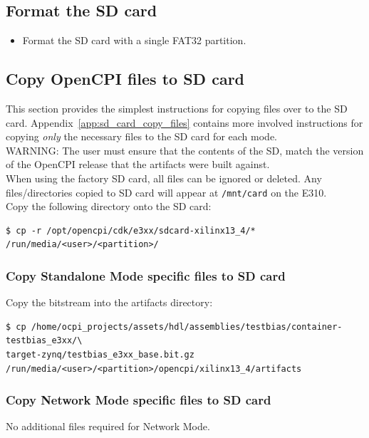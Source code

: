 \subsection{Format the SD card}
\begin{itemize}
\item Format the SD card with a single FAT32 partition.
\end{itemize}

\subsection{Copy OpenCPI files to SD card}
This section provides the simplest instructions for copying files over to the SD card. Appendix~\ref{app:sd_card_copy_files} contains more involved instructions for copying \textit{only} the necessary files to the SD card for each mode.\\

\noindent WARNING: The user must ensure that the contents of the SD, match the version of the OpenCPI release that the artifacts were built against.\\

\noindent When using the factory SD card, all files can be ignored or deleted. Any files/directories copied to SD card will appear at \texttt{/mnt/card} on the E310.\\

\noindent Copy the following directory onto the SD card:
\begin{verbatim}
$ cp -r /opt/opencpi/cdk/e3xx/sdcard-xilinx13_4/* /run/media/<user>/<partition>/
\end{verbatim}

\subsubsection{Copy Standalone Mode specific files to SD card}
Copy the  bitstream into the artifacts directory:
\begin{verbatim}
$ cp /home/ocpi_projects/assets/hdl/assemblies/testbias/container-testbias_e3xx/\
target-zynq/testbias_e3xx_base.bit.gz /run/media/<user>/<partition>/opencpi/xilinx13_4/artifacts
\end{verbatim}

\subsubsection{Copy Network Mode specific files to SD card}
No additional files required for Network Mode.

